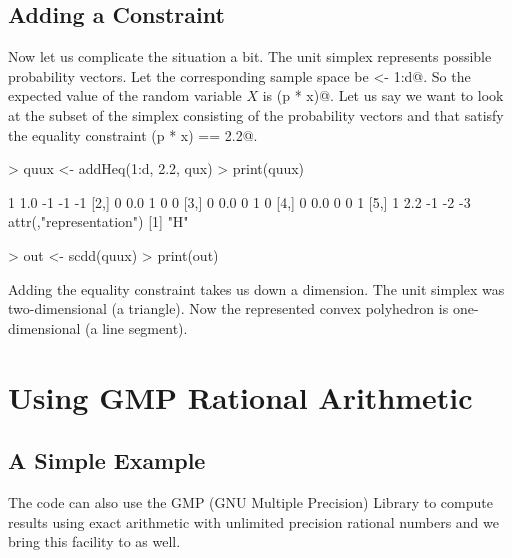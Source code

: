 \documentclass{article}
\begin{document}
\subsection{Adding a Constraint}

Now let us complicate the situation a bit.  The unit simplex represents
possible probability vectors.  Let the corresponding sample space be
\verb@x <- 1:d@.  So the expected value of the random variable $X$ is
\verb@sum(p * x)@.  Let us say we want to look at the
subset of the simplex consisting of the
probability vectors \verb@p@ and that satisfy the equality constraint
\verb@sum(p * x) == 2.2@.
\begin{Schunk}
\begin{Sinput}
> quux <- addHeq(1:d, 2.2, qux)
> print(quux)
\end{Sinput}
\begin{Soutput}
     [,1] [,2] [,3] [,4] [,5]
[1,]    1  1.0   -1   -1   -1
[2,]    0  0.0    1    0    0
[3,]    0  0.0    0    1    0
[4,]    0  0.0    0    0    1
[5,]    1  2.2   -1   -2   -3
attr(,"representation")
[1] "H"
\end{Soutput}
\begin{Sinput}
> out <- scdd(quux)
> print(out)
\end{Sinput}
\end{Schunk}
Adding the equality constraint takes us down a dimension.  The unit
simplex was two-dimensional (a triangle).  Now the represented convex
polyhedron is one-dimensional (a line segment).

\section{Using GMP Rational Arithmetic} \label{sec:gmp}

\subsection{A Simple Example}

The \verb@cddlib@ code can also use the GMP (GNU Multiple Precision) Library
to compute results using exact arithmetic with unlimited precision rational
numbers and we bring this facility to \verb@rcdd@ as well.
\end{document}
